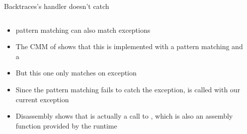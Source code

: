 \begin{frame}{Backtraces}{'s handler doesn't catch }
  \begin{columns}[c]
    \begin{column}{0.45\textwidth}
      \minipage[c][0.75\textheight][s]{\columnwidth}
      \begin{itemize}
        \item<1-> \footnotemark pattern matching can also match exceptions
        \item<1-> The CMM of  shows that this  is implemented with a pattern matching and a 
        \item<1-> But this one only matches on  exception
        \item<2-> Since the pattern matching fails to catch the exception,  is called with our current  exception
        \item<3-> Disassembly shows that  is actually a call to , which is also an assembly function provided by the runtime
      \end{itemize}
      \vfill
      \endminipage
    \end{column}
    \begin{column}{0.55\textwidth}
      \centering
    \end{column}
  \end{columns}
\end{frame}

\newcommand\listCamlReraiseExn[1][]{
  \listasm[firstline=727,lastline=734,#1]{../ocaml/runtime/amd64.S}{runtime/amd64.S:727}}

